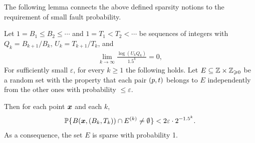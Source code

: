 \documentclass[12pt]{memoir}
\def\B{B}
\def\U{U}
\newcommand{\Tu}{T}
\begin{document}
The following lemma connects the above defined sparsity notions to the requirement
of small fault probability.

\begin{lemma}[Sparsity]\label{lem:sparsiness}
Let \( 1=\B_{1}\le  \B_{2}\le\dotsm \) and 
\( 1=\Tu_{1}<T_{2}<\dotsm \) be sequences of integers with
\( Q_k = B_{k+1}/B_{k} \), \( \U_k = \Tu_{k+1}/\Tu_{k} \), and
\begin{align}\label{eq:assumption}
  \lim_{k\rightarrow\infty}\frac{\log(\U_{k} Q_k)}{1.5^k}=0,
\end{align}
For sufficiently small \( \varepsilon \), for every \( k\ge 1 \) the following holds.
Let \( E\subseteq \mathbb{Z}\times \mathbb{Z}_{\geqslant 0} \)
be a random set with the property that each pair \( (p,t) \) belongs to \( E \)
independently from the other ones with probability \( \le \varepsilon \).

Then for each point \( \boldsymbol{x} \)  and each \( k \),
 \begin{align*}
   \Pbof{B(\vek{x},(\B_k, \Tu_{k}))\cap E^{(k)}\neq\emptyset} <2\varepsilon \cdot 2^{-1.5^{k}}.
 \end{align*}
As a consequence, the set \( E \) is sparse with probability 1.
\end{lemma}
\end{document}
